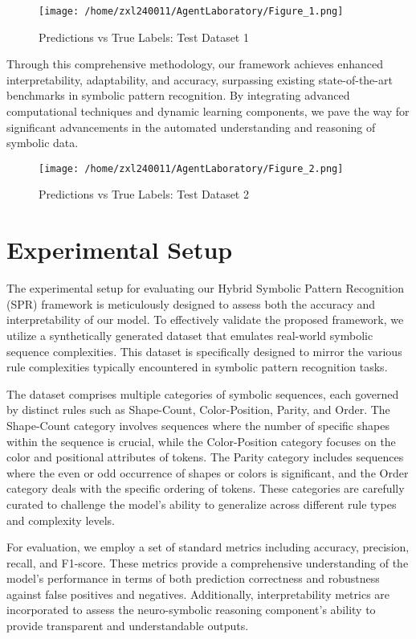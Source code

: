 \documentclass{article}
\begin{document}
\begin{figure}[h]
\caption{Predictions vs True Labels: Test Dataset 1}
\centering
\texttt{[image: /home/zxl240011/AgentLaboratory/Figure\_1.png]}
\label{fig:fig1}
\end{figure}

Through this comprehensive methodology, our framework achieves enhanced interpretability, adaptability, and accuracy, surpassing existing state-of-the-art benchmarks in symbolic pattern recognition. By integrating advanced computational techniques and dynamic learning components, we pave the way for significant advancements in the automated understanding and reasoning of symbolic data.

\begin{figure}[h]
\caption{Predictions vs True Labels: Test Dataset 2}
\centering
\texttt{[image: /home/zxl240011/AgentLaboratory/Figure\_2.png]}
\label{fig:fig2}
\end{figure}

\section{Experimental Setup}
The experimental setup for evaluating our Hybrid Symbolic Pattern Recognition (SPR) framework is meticulously designed to assess both the accuracy and interpretability of our model. To effectively validate the proposed framework, we utilize a synthetically generated dataset that emulates real-world symbolic sequence complexities. This dataset is specifically designed to mirror the various rule complexities typically encountered in symbolic pattern recognition tasks. 

The dataset comprises multiple categories of symbolic sequences, each governed by distinct rules such as Shape-Count, Color-Position, Parity, and Order. The Shape-Count category involves sequences where the number of specific shapes within the sequence is crucial, while the Color-Position category focuses on the color and positional attributes of tokens. The Parity category includes sequences where the even or odd occurrence of shapes or colors is significant, and the Order category deals with the specific ordering of tokens. These categories are carefully curated to challenge the model's ability to generalize across different rule types and complexity levels.

For evaluation, we employ a set of standard metrics including accuracy, precision, recall, and F1-score. These metrics provide a comprehensive understanding of the model's performance in terms of both prediction correctness and robustness against false positives and negatives. Additionally, interpretability metrics are incorporated to assess the neuro-symbolic reasoning component's ability to provide transparent and understandable outputs.
\end{document}
